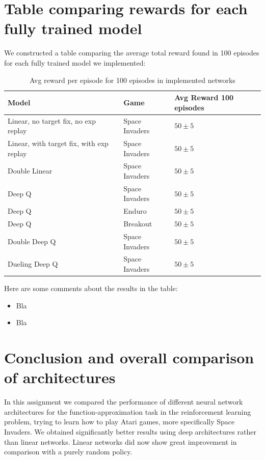 \documentclass{article}
\begin{document}
\section{Table comparing rewards for each fully trained model} %
\label{sec:table_comparing_rewards_for_each_fully_trained_model}
We constructed a table comparing the average total reward found in 100 episodes for each fully trained model we implemented:

\begin{table}[h]
  \caption{Avg reward per episode for 100 episodes in implemented networks}
  \label{sample-table}
  \centering
  \begin{tabular}{lll}
    \toprule

    Model     & Game     & Avg Reward 100 episodes \\
    \midrule
    Linear, no target fix, no exp replay & Space Invaders  & $50\pm5$     \\
    Linear, with target fix, with exp replay & Space Invaders  & $50\pm5$     \\
    Double Linear & Space Invaders  & $50\pm5$     \\
    Deep Q & Space Invaders  & $50\pm5$     \\
    Deep Q & Enduro  & $50\pm5$     \\
    Deep Q & Breakout  & $50\pm5$     \\
    Double Deep Q & Space Invaders  & $50\pm5$     \\
    Dueling Deep Q & Space Invaders  & $50\pm5$     \\
    \bottomrule
  \end{tabular}
\end{table}

Here are some comments about the results in the table:
\begin{itemize}
  \item Bla
  \item Bla
\end{itemize}

\section{Conclusion and overall comparison of architectures} %
\label{sec:conclusion_and_overall_comparison_of_architectures}
In this assignment we compared the performance of different neural network architectures for the function-approximation task in the reinforcement learning problem, trying to learn how to play Atari games, more specifically Space Invaders. We obtained significantly better results using deep architectures rather than linear networks. Linear networks did now show great improvement in comparison with a purely random policy.
\end{document}
